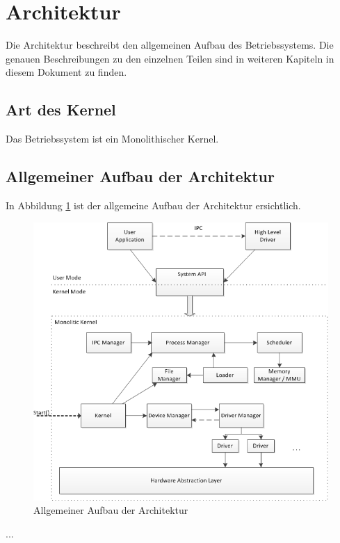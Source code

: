 \section{Architektur}
Die Architektur beschreibt den allgemeinen Aufbau des Betriebssystems. Die genauen Beschreibungen zu den einzelnen Teilen sind in weiteren Kapiteln in diesem Dokument zu finden.

\subsection{Art des Kernel}
Das Betriebssystem ist ein Monolithischer Kernel. 

\subsection{Allgemeiner Aufbau der Architektur}
In Abbildung \ref{fig:general-Architecture} ist der allgemeine Aufbau der Architektur ersichtlich. 

\begin{figure}[H]
	\includegraphics[scale=0.9]{chapters/architecture/figures/architecture}
	\caption{Allgemeiner Aufbau der Architektur}
	\label{fig:general-Architecture}
\end{figure}

...

\pagebreak 